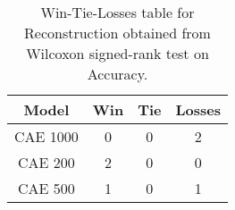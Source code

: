\begin{table}
\centering
\caption{Win-Tie-Losses table for Reconstruction obtained from Wilcoxon signed-rank test on Accuracy.}
\label{tab:reconstruction_model_training_data_comparison_Accuracy}
\begin{tabular}{|c|c|c|c|}
\toprule
\textbf{Model} &  \textbf{Win} &  \textbf{Tie} &  \textbf{Losses} \\
\midrule
      CAE 1000 &             0 &             0 &                2 \\
       CAE 200 &             2 &             0 &                0 \\
       CAE 500 &             1 &             0 &                1 \\
\bottomrule
\end{tabular}
\end{table}
